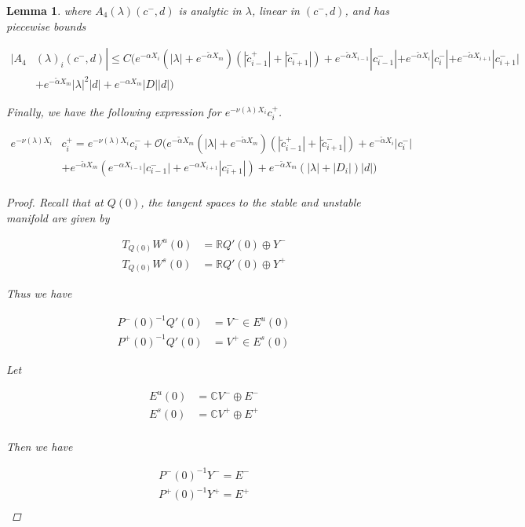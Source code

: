 \documentclass[12pt]{article}
\def\R{{\mathbb R}}
\def\C{{\mathbb C}}
\newtheorem{lemma}{Lemma}
\begin{document}
\begin{lemma}
where $A_4(\lambda)(c^-, d)$ is analytic in $\lambda$, linear in $(c^-, d)$, and has piecewise bounds

\begin{align}
|A_4&(\lambda)_i(c^-, d)|
\leq C \Big( 
e^{-\alpha X_i} (|\lambda| + e^{-\tilde{\alpha}X_m})(|\tilde{c}_{i-1}^+| + |\tilde{c}_{i+1}^-|) + e^{-\tilde{\alpha}X_{i-1}}|c_{i-1}^-| + e^{-\tilde{\alpha}X_i}|c_i^-| + e^{-\tilde{\alpha}X_{i+1}}|c_{i+1}^-| \\
&+ e^{-\tilde{\alpha} X_m} |\lambda|^2|d| + e^{-\alpha X_m}|D||d| \Big)
\end{align}

Finally, we have the following expression for $e^{-\nu(\lambda)X_i} c_i^+$.

\begin{align}\label{tildecminus}
e^{-\nu(\lambda)X_i} &c_i^+ = e^{-\nu(\lambda)X_i} c_i^- 
+ \mathcal{O}\Big( e^{-\tilde{\alpha}X_m} (|\lambda| + e^{-\tilde{\alpha}X_m})( |\tilde{c}_{i-1}^+| + |\tilde{c}_{i+1}^-|) 
+ e^{-\tilde{\alpha}X_i}|c_i^-| \\
&+ e^{-\tilde{\alpha}X_m}( e^{-\alpha X_{i-1}}|c_{i-1}^-| + e^{-\alpha X_{i+1}}|c_{i+1}^-| ) + e^{-\tilde{\alpha}X_m}(|\lambda| + |D_i|)|d| \Big) \\
\end{align}

\begin{proof}

Recall that at $Q(0)$, the tangent spaces to the stable and unstable manifold are given by

\begin{align*}
T_{Q(0)} W^u(0) &= \R Q'(0) \oplus Y^- \\
T_{Q(0)} W^s(0) &= \R Q'(0) \oplus Y^+
\end{align*}

Thus we have

\begin{align*}
P^-(0)^{-1} Q'(0) &= V^- \in E^u(0) \\
P^+(0)^{-1} Q'(0) &= V^+ \in E^s(0)
\end{align*}

Let

\begin{align*}
E^u(0) &= \C V^- \oplus E^- \\
E^s(0) &= \C V^+ \oplus E^+ \\
\end{align*}

Then we have

\begin{align*}
P^-(0)^{-1} Y^- = E^- \\
P^+(0)^{-1} Y^+ = E^+ \\
\end{align*}


\end{proof}
\end{lemma}
\end{document}

